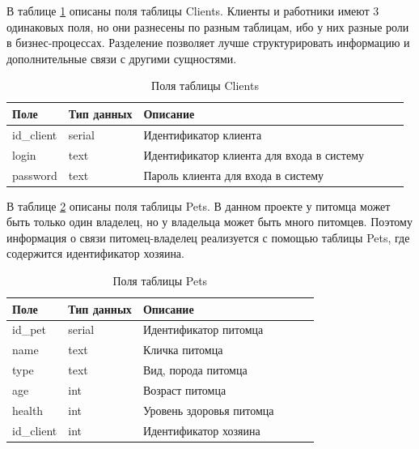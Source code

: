 В таблице \ref{tab:clients}  описаны поля таблицы Clients. Клиенты и работники имеют 3 одинаковых поля, но они разнесены по разным таблицам, ибо у них разные роли в бизнес-процессах. Разделение позволяет лучше структурировать информацию и дополнительные связи с другими сущностями.
\begin{table}[hbtp]
	\begin{center}
		\caption{\label{tab:clients}Поля таблицы Clients}
		\begin{tabular}{|l|l|l|l|l|l|}
			\hline {Поле} & {Тип данных} & {Описание}  \\ \hline
		id\_client  & serial & Идентификатор клиента   \\ \hline
		login & text & Идентификатор клиента для входа в систему \\ \hline
		password & text & Пароль клиента для входа в систему  \\ \hline
		\end{tabular}
	\end{center}
\end{table}

 В таблице \ref{tab:pets}  описаны поля таблицы Pets. В данном проекте у питомца может быть только один владелец, но у владельца может быть много питомцев. Поэтому информация о связи питомец-владелец реализуется с помощью таблицы Pets, где содержится идентификатор хозяина. 

\begin{table}[hbtp]
	\begin{center}
			\captionsetup{justification=raggedright, singlelinecheck=false}
			\caption{\label{tab:pets}Поля таблицы Pets}
		\begin{tabular}{|l|l|l|l|l|l|}
			\hline {Поле} & {Тип данных} & {Описание}  \\ \hline
			id\_pet  & serial & Идентификатор питомца   \\ \hline
			name & text & Кличка питомца \\ \hline
			type & text & Вид, порода питомца  \\ \hline
			age & int & Возраст питомца \\ \hline
			health & int & Уровень здоровья питомца  \\ \hline
			id\_client & int & Идентификатор хозяина  \\ \hline
		\end{tabular}
	\end{center}
\end{table}


